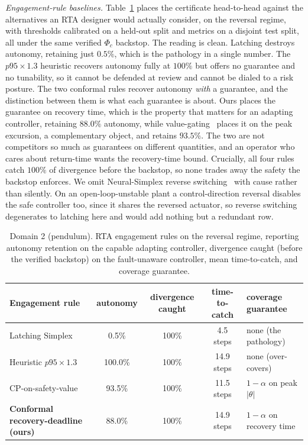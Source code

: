 \documentclass[journal]{IEEEtran}
\theoremstyle{plain}
\theoremstyle{definition}
\begin{document}
\emph{Engagement-rule baselines.} Table~\ref{tab:pend} places the certificate head-to-head
against the alternatives an RTA designer would actually consider, on the reversal regime, with
thresholds calibrated on a held-out split and metrics on a disjoint test split, all under the
same verified $\Phi_c$ backstop. The reading is clean. Latching destroys autonomy, retaining
just $0.5\%$, which is the pathology in a single number. The $p95\times1.3$ heuristic recovers
autonomy fully at $100\%$ but offers no guarantee and no tunability, so it cannot be defended
at review and cannot be dialed to a risk posture. The two conformal rules recover autonomy
\emph{with} a guarantee, and the distinction between them is what each guarantee is about.
Ours places the guarantee on recovery time, which is the property that matters for an adapting
controller, retaining $88.0\%$ autonomy, while value-gating~\cite{Tabbara2025} places it on
the peak excursion, a complementary object, and retains $93.5\%$. The two are not competitors
so much as guarantees on different quantities, and an operator who cares about return-time
wants the recovery-time bound. Crucially, all four rules catch $100\%$ of divergence before
the backstop, so none trades away the safety the backstop enforces. We omit Neural-Simplex
reverse switching~\cite{Phan2020} with cause rather than silently. On an open-loop-unstable
plant a control-direction reversal disables the safe controller too, since it shares the
reversed actuator, so reverse switching degenerates to latching here and would add nothing but
a redundant row.

\begin{table}[!t]\centering\footnotesize
\caption{Domain 2 (pendulum). RTA engagement rules on the reversal regime, reporting autonomy retention on the capable adapting controller, divergence caught (before the verified backstop) on the fault-unaware controller, mean time-to-catch, and coverage guarantee.}
\label{tab:pend}
\setlength{\tabcolsep}{4pt}
\begin{tabular}{lcccl}
\toprule
Engagement rule & autonomy & divergence caught & time-to-catch & coverage guarantee \\
\midrule
Latching Simplex & 0.5\% & 100\% & 4.5 steps & none (the pathology) \\
Heuristic $p95\times1.3$ & 100.0\% & 100\% & 14.9 steps & none (over-covers) \\
CP-on-safety-value~\cite{Tabbara2025} & 93.5\% & 100\% & 11.5 steps & $1-\alpha$ on peak $|\theta|$ \\
\textbf{Conformal recovery-deadline (ours)} & 88.0\% & 100\% & 14.9 steps & $1-\alpha$ on recovery time \\
\bottomrule
\end{tabular}
\end{table}
\end{document}
